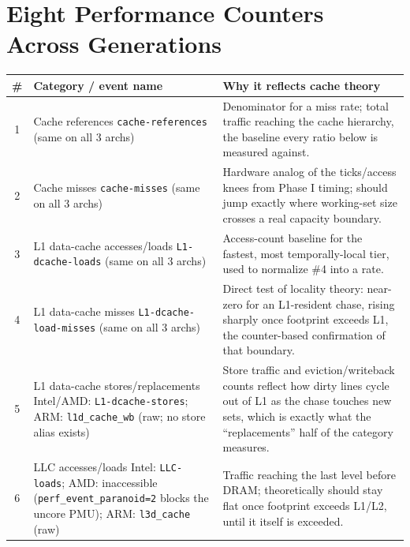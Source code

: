 \documentclass{article}
\begin{document}
\Needspace{0.6\textheight}
\section{Eight Performance Counters Across Generations}

\begin{table}[htbp]
\centering
\small
\begin{tabular}{@{} c p{4.3cm} p{9cm} @{}}
\toprule
\textbf{\#} & \textbf{Category / event name} & \textbf{Why it reflects cache theory} \\
\midrule

1 & Cache references \newline \texttt{cache-references} (same on all 3 archs) &
Denominator for a miss rate; total traffic reaching the cache hierarchy, the baseline every ratio below is measured against. \\

2 & Cache misses \newline \texttt{cache-misses} (same on all 3 archs) &
Hardware analog of the ticks/access knees from Phase I timing; should jump exactly where working-set size crosses a real capacity boundary. \\

3 & L1 data-cache accesses/loads \newline \texttt{L1-dcache-loads} (same on all 3 archs) &
Access-count baseline for the fastest, most temporally-local tier, used to normalize \#4 into a rate. \\

4 & L1 data-cache misses \newline \texttt{L1-dcache-load-misses} (same on all 3 archs) &
Direct test of locality theory: near-zero for an L1-resident chase, rising sharply once footprint exceeds L1, the counter-based confirmation of that boundary. \\

5 & L1 data-cache stores/replacements \newline Intel/AMD: \texttt{L1-dcache-stores}; ARM: \texttt{l1d\_cache\_wb} (raw; no store alias exists) &
Store traffic and eviction/writeback counts reflect how dirty lines cycle out of L1 as the chase touches new sets, which is exactly what the ``replacements'' half of the category measures. \\

6 & LLC accesses/loads \newline Intel: \texttt{LLC-loads}; AMD: inaccessible (\texttt{perf\_event\_paranoid=2} blocks the uncore PMU); ARM: \texttt{l3d\_cache} (raw) &
Traffic reaching the last level before DRAM; theoretically should stay flat once footprint exceeds L1/L2, until it itself is exceeded. \\


\end{tabular}
\end{table}
\end{document}
